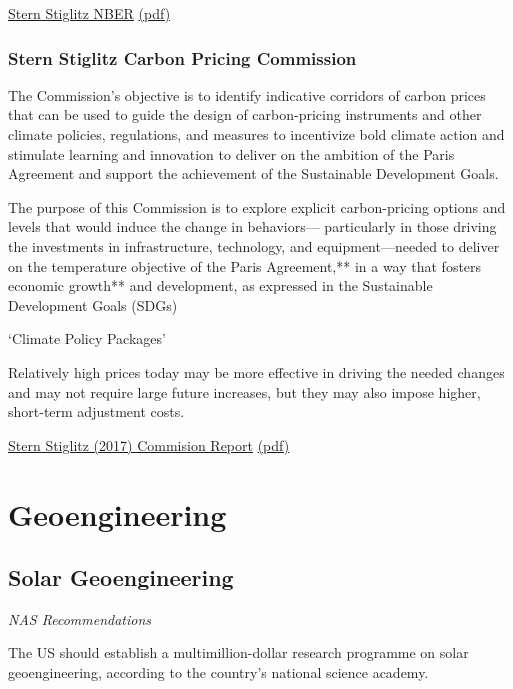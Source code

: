 \documentclass[
]{book}
\begin{document}
\href{https://www.nber.org/papers/w28472}{Stern Stiglitz NBER}
\href{pdf/Stern_Stiglitz_2021_SCC_Alternative_w28472.pdf}{(pdf)}

\hypertarget{stern-stiglitz-carbon-pricing-commission}{%
\subsection{Stern Stiglitz Carbon Pricing Commission}\label{stern-stiglitz-carbon-pricing-commission}}

The Commission's objective is to identify indicative corridors of carbon prices that can
be used to guide the design of carbon-pricing instruments and other climate policies,
regulations, and measures to incentivize bold climate action and stimulate learning and
innovation to deliver on the ambition of the Paris Agreement and support the achievement
of the Sustainable Development Goals.

The purpose of this Commission is to explore explicit carbon-pricing
options and levels that would induce the change in behaviors---
particularly in those driving the investments in infrastructure,
technology, and equipment---needed to deliver on the temperature
objective of the Paris Agreement,** in a way that fosters economic
growth** and development, as expressed in the Sustainable
Development Goals (SDGs)

`Climate Policy Packages'

Relatively high prices today may be more effective in driving the needed changes
and may not require large future increases,
but they may also impose higher, short-term adjustment costs.

\href{https://www.carbonpricingleadership.org/report-of-the-highlevel-commission-on-carbon-prices}{Stern Stiglitz (2017) Commision Report}
\href{pdf/Stern_Stiglitz_2017_Commision_Report.pdf}{(pdf)}

\hypertarget{geoengineering}{%
\chapter{Geoengineering}\label{geoengineering}}

\hypertarget{solar-geoengineering}{%
\section{Solar Geoengineering}\label{solar-geoengineering}}

\emph{NAS Recommendations}

The US should establish a multimillion-dollar research programme on solar geoengineering, according to the country's national science academy.
\end{document}
